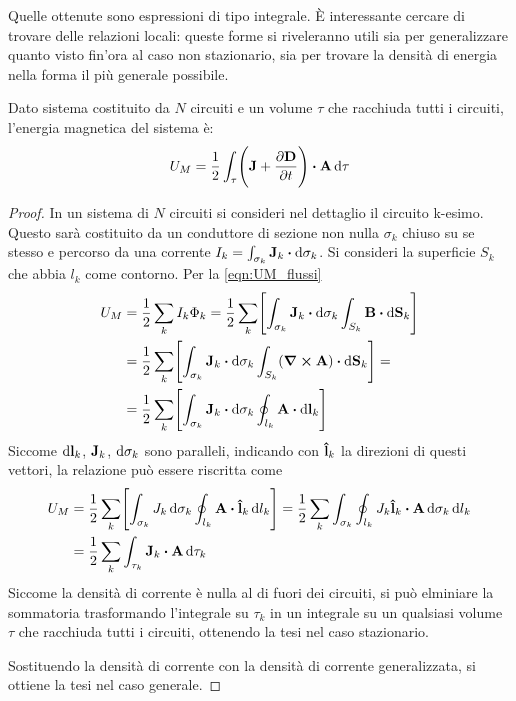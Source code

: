 Quelle ottenute sono espressioni di tipo integrale. È interessante cercare di trovare delle relazioni locali:
queste forme si riveleranno utili sia per generalizzare quanto visto fin'ora al caso non stazionario,
sia per trovare la densità di energia nella forma il più generale possibile.
\begin{thm}
    Dato sistema costituito da $N$ circuiti e un volume $\tau$ che racchiuda tutti i circuiti, l'energia magnetica del sistema è:
    \begin{equation}
        \label{eqn:UM_J_A}
        U_M= \rec{2}\int_\tau \Biggl(\vb{J}+\pdv{\vb{D}}{t}\Biggr)\vdot\vb{A}\dd{\tau}
    \end{equation}
\end{thm}
\begin{proof}
    In un sistema di $N$ circuiti si consideri nel dettaglio il circuito k-esimo.
    Questo sarà costituito da un conduttore di sezione non nulla $\sigma_k$ chiuso su se stesso
    e percorso da una corrente $I_k=\int_{\sigma_k}\vb{J}_k\vdot\dd{\vb{\sigma}_k}$.
    Si consideri la superficie $S_k$ che abbia $l_k$ come contorno. Per la \eqref{eqn:UM_flussi}
    \[
        \begin{split}
            U_M &=\rec{2}\sum_k I_k\Phi_k=\rec{2}\sum_k\Biggl[\int_{\sigma_k}\vb{J}_k\vdot\dd{\vb{\sigma}_k} \int_{S_k}\vb{B}\vdot\dd{\vb{S}_k} \Biggr]\\
            &=\rec{2}\sum_k\Biggl[\int_{\sigma_k}\vb{J}_k\vdot\dd{\vb{\sigma}_k} \int_{S_k}(\curl{\vb{A}})\vdot\dd{\vb{S}_k} \Biggr]=\\
            &=\rec{2}\sum_k\Biggl[\int_{\sigma_k}\vb{J}_k\vdot\dd{\vb{\sigma}_k} \oint_{l_k}\vb{A}\vdot\dd{\vb{l}_k} \Biggr]
        \end{split}
    \]
    Siccome $\dd{\vb{l}_k}$, $\vb{J}_k$, $\dd{\vb{\sigma}_k}$ sono paralleli, indicando con $\vu{l}_k$
    la direzioni di questi vettori, la relazione può essere riscritta come
    \[
        \begin{split}
            U_M&=\rec{2}\sum_k\Biggl[\int_{\sigma_k}J_k\dd{\sigma_k} \oint_{l_k}\vb{A}\vdot\vu{l}_k\dd{l_k} \Biggr]
            =\rec{2}\sum_k \int_{\sigma_k}\oint_{l_k}J_k\vu{l}_k \vdot \vb{A}\dd{\sigma_k}\dd{l_k} \\
            &=\rec{2}\sum_k \int_{\tau_k} \vb{J}_k \vdot \vb{A}\dd{\tau_k}
        \end{split}
    \]
    Siccome la densità di corrente è nulla al di fuori dei circuiti, si può elminiare la sommatoria
    trasformando l'integrale su $\tau_k$ in un integrale su un qualsiasi volume $\tau$ che racchiuda tutti i circuiti,
    ottenendo la tesi nel caso stazionario.

    Sostituendo la densità di corrente con la densità di corrente
    generalizzata, si ottiene la tesi nel caso generale.
\end{proof}

